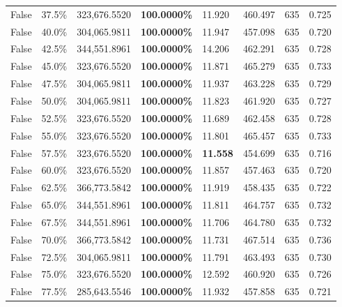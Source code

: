 \begin{table}[H]
\begin{tabular}{lllrllll}
\cline{1-8}
False & 37.5\% & 323,676.5520 & \bfseries \color{red} 100.0000\% & 11.920 & 460.497 & 635 & 0.725 \\
\cline{1-8}
False & 40.0\% & 304,065.9811 & \bfseries \color{red} 100.0000\% & 11.947 & 457.098 & 635 & 0.720 \\
\cline{1-8}
False & 42.5\% & 344,551.8961 & \bfseries \color{red} 100.0000\% & 14.206 & 462.291 & 635 & 0.728 \\
\cline{1-8}
False & 45.0\% & 323,676.5520 & \bfseries \color{red} 100.0000\% & 11.871 & 465.279 & 635 & 0.733 \\
\cline{1-8}
False & 47.5\% & 304,065.9811 & \bfseries \color{red} 100.0000\% & 11.937 & 463.228 & 635 & 0.729 \\
\cline{1-8}
False & 50.0\% & 304,065.9811 & \bfseries \color{red} 100.0000\% & 11.823 & 461.920 & 635 & 0.727 \\
\cline{1-8}
False & 52.5\% & 323,676.5520 & \bfseries \color{red} 100.0000\% & 11.689 & 462.458 & 635 & 0.728 \\
\cline{1-8}
False & 55.0\% & 323,676.5520 & \bfseries \color{red} 100.0000\% & 11.801 & 465.457 & 635 & 0.733 \\
\cline{1-8}
False & 57.5\% & 323,676.5520 & \bfseries \color{red} 100.0000\% & \bfseries \color{red} 11.558 & 454.699 & 635 & 0.716 \\
\cline{1-8}
False & 60.0\% & 323,676.5520 & \bfseries \color{red} 100.0000\% & 11.857 & 457.463 & 635 & 0.720 \\
\cline{1-8}
False & 62.5\% & 366,773.5842 & \bfseries \color{red} 100.0000\% & 11.919 & 458.435 & 635 & 0.722 \\
\cline{1-8}
False & 65.0\% & 344,551.8961 & \bfseries \color{red} 100.0000\% & 11.811 & 464.757 & 635 & 0.732 \\
\cline{1-8}
False & 67.5\% & 344,551.8961 & \bfseries \color{red} 100.0000\% & 11.706 & 464.780 & 635 & 0.732 \\
\cline{1-8}
False & 70.0\% & 366,773.5842 & \bfseries \color{red} 100.0000\% & 11.731 & 467.514 & 635 & 0.736 \\
\cline{1-8}
False & 72.5\% & 304,065.9811 & \bfseries \color{red} 100.0000\% & 11.791 & 463.493 & 635 & 0.730 \\
\cline{1-8}
False & 75.0\% & 323,676.5520 & \bfseries \color{red} 100.0000\% & 12.592 & 460.920 & 635 & 0.726 \\
\cline{1-8}
False & 77.5\% & \color{red} 285,643.5546 & \bfseries \color{red} 100.0000\% & 11.932 & 457.858 & 635 & 0.721 \\

\end{tabular}
\end{table}
